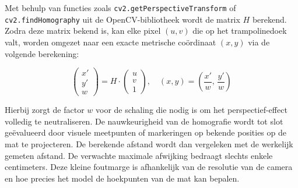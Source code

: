 Met behulp van functies zoals \texttt{cv2.getPerspectiveTransform} of \texttt{cv2.findHomography} uit de OpenCV-bibliotheek wordt de matrix $H$ berekend. Zodra deze matrix bekend is, kan elke pixel $(u, v)$ die op het trampolinedoek valt, worden omgezet naar een exacte metrische coördinaat $(x, y)$ via de volgende berekening:

\[
    \begin{pmatrix} x' \\ y' \\ w \end{pmatrix} = H \cdot \begin{pmatrix} u \\ v \\ 1 \end{pmatrix}, \quad (x, y) = \left(\frac{x'}{w},\, \frac{y'}{w}\right)
\]

Hierbij zorgt de factor $w$ voor de schaling die nodig is om het perspectief-effect volledig te neutraliseren. De nauwkeurigheid van de homografie wordt tot slot ge{\"e}valueerd door visuele meetpunten of markeringen op bekende posities op de mat te projecteren. De berekende afstand wordt dan vergeleken met de werkelijk gemeten afstand. De verwachte maximale afwijking bedraagt slechts enkele centimeters. Deze kleine foutmarge is afhankelijk van de resolutie van de camera en hoe precies het model de hoekpunten van de mat kan bepalen.

